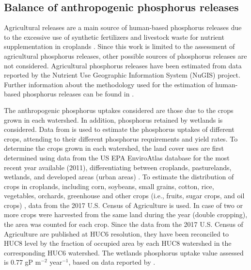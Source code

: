 \documentclass[10pt,a4paper]{article}
\begin{document}
\subsection{Balance of anthropogenic phosphorus releases}
Agricultural releases are a main source of human-based phosphorus releases due to the excessive use of synthetic fertilizers and livestock waste for nutrient supplementation in croplands . Since this work is limited to the assessment of agricultural phosphorus releases, other possible sources of phosphorus releases are not considered. Agricultural phosphorus releases have been estimated from data reported by the Nutrient Use Geographic Information System (NuGIS) project. Further information about the methodology used for the estimation of human-based phosphorus releases can be found in .

The anthropogenic phosphorus uptakes considered are those due to the crops grown in each watershed. In addition, phosphorus retained by wetlands is considered. Data from  is used to estimate the phosphorus uptakes of different crops, attending to their different phosphorus requirements and yield rates. To determine the crops grown in each watershed, the land cover uses are first determined using data from the US EPA EnviroAtlas database for the most recent year available (2011), differentiating between croplands, pasturelands, wetlands, and developed areas (urban areas) . To estimate the distribution of crops in croplands, including corn, soybeans, small grains, cotton, rice, vegetables, orchards, greenhouse and other crops (i.e., fruits, sugar crops, and oil crops) , data from the 2017 U.S. Census of Agriculture is used. In case of two or more crops were harvested from the same land during the year (double cropping), the area was counted for each crop. Since the data from the 2017 U.S. Census of Agriculture are published at HUC6 resolution, they have been reconciled to HUC8 level by the fraction of occupied area by each HUC8 watershed in the corresponding HUC6 watershed. The wetlands phosphorus uptake value assessed is 0.77 gP m$^{-2}$ year$^{-1}$, based on data reported by .
\end{document}
